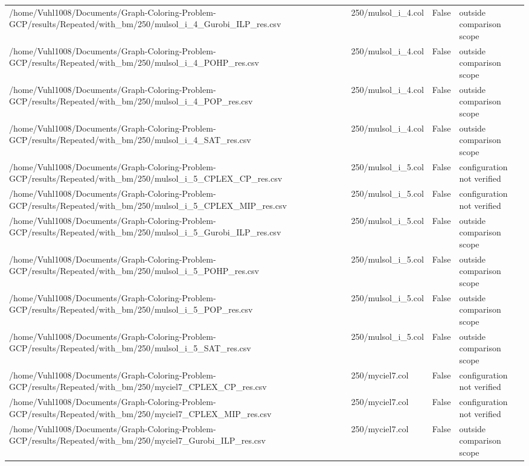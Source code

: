 \begin{table}[htbp]
\begin{tabular}{llll}
/home/Vuhl1008/Documents/Graph-Coloring-Problem-GCP/results/Repeated/with\_bm/250/mulsol\_i\_4\_Gurobi\_ILP\_res.csv & 250/mulsol\_i\_4.col & False & outside comparison scope \\
/home/Vuhl1008/Documents/Graph-Coloring-Problem-GCP/results/Repeated/with\_bm/250/mulsol\_i\_4\_POHP\_res.csv & 250/mulsol\_i\_4.col & False & outside comparison scope \\
/home/Vuhl1008/Documents/Graph-Coloring-Problem-GCP/results/Repeated/with\_bm/250/mulsol\_i\_4\_POP\_res.csv & 250/mulsol\_i\_4.col & False & outside comparison scope \\
/home/Vuhl1008/Documents/Graph-Coloring-Problem-GCP/results/Repeated/with\_bm/250/mulsol\_i\_4\_SAT\_res.csv & 250/mulsol\_i\_4.col & False & outside comparison scope \\
/home/Vuhl1008/Documents/Graph-Coloring-Problem-GCP/results/Repeated/with\_bm/250/mulsol\_i\_5\_CPLEX\_CP\_res.csv & 250/mulsol\_i\_5.col & False & configuration not verified \\
/home/Vuhl1008/Documents/Graph-Coloring-Problem-GCP/results/Repeated/with\_bm/250/mulsol\_i\_5\_CPLEX\_MIP\_res.csv & 250/mulsol\_i\_5.col & False & configuration not verified \\
/home/Vuhl1008/Documents/Graph-Coloring-Problem-GCP/results/Repeated/with\_bm/250/mulsol\_i\_5\_Gurobi\_ILP\_res.csv & 250/mulsol\_i\_5.col & False & outside comparison scope \\
/home/Vuhl1008/Documents/Graph-Coloring-Problem-GCP/results/Repeated/with\_bm/250/mulsol\_i\_5\_POHP\_res.csv & 250/mulsol\_i\_5.col & False & outside comparison scope \\
/home/Vuhl1008/Documents/Graph-Coloring-Problem-GCP/results/Repeated/with\_bm/250/mulsol\_i\_5\_POP\_res.csv & 250/mulsol\_i\_5.col & False & outside comparison scope \\
/home/Vuhl1008/Documents/Graph-Coloring-Problem-GCP/results/Repeated/with\_bm/250/mulsol\_i\_5\_SAT\_res.csv & 250/mulsol\_i\_5.col & False & outside comparison scope \\
/home/Vuhl1008/Documents/Graph-Coloring-Problem-GCP/results/Repeated/with\_bm/250/myciel7\_CPLEX\_CP\_res.csv & 250/myciel7.col & False & configuration not verified \\
/home/Vuhl1008/Documents/Graph-Coloring-Problem-GCP/results/Repeated/with\_bm/250/myciel7\_CPLEX\_MIP\_res.csv & 250/myciel7.col & False & configuration not verified \\
/home/Vuhl1008/Documents/Graph-Coloring-Problem-GCP/results/Repeated/with\_bm/250/myciel7\_Gurobi\_ILP\_res.csv & 250/myciel7.col & False & outside comparison scope \\

\end{tabular}
\end{table}
